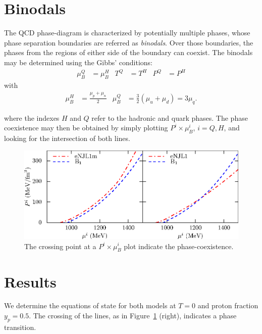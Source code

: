 \documentclass{ws-ijmpcs}
\begin{document}
\section{Binodals}

The QCD phase-diagram is characterized by potentially multiple phases, whose phase separation boundaries are referred as \emph{binodals}. Over those boundaries, the phases from the regions of either side of the boundary can coexist. The binodals may be determined using the Gibbs' conditions\cite{Cavagnoli2011}:
\begin{align}
\mu_B^Q &= \mu_B^H & T^Q &= T^H & P^Q &= P^H
\end{align}
%
with
\begin{align*}
\mu_B^H &= \frac{\mu_p + \mu_n}{2} & 	\mu_B^Q &= \frac{3}{2} (\mu_u + \mu_d) = 3 \mu_q.
\end{align*}

\noindent{}where the indexes $H$ and $Q$ refer to the hadronic and quark phases. The phase coexistence may then be obtained by simply plotting $P^i \times \mu_B^i$, $i = Q, H$, and looking for the intersection of both lines\cite{Tsue2010,Lee2013}.


\begin{figure}[!ht]
\centering
\caption{The crossing point at a $P^i \times \mu_B^i$ plot indicate the phase-coexistence.\label{Fig:Pressure_func_chemical_pot}}
\includegraphics{quark-hadron_phase_transition.eps}
\end{figure}

\section{Results}

We determine the equations of state for both models at $T = 0$ and proton fraction $y_p = 0.5$. The crossing of the lines, as in Figure~\ref{Fig:Pressure_func_chemical_pot} (right), indicates a phase transition.
\end{document}
